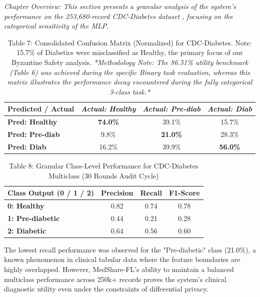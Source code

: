 \documentclass[10pt, a4paper, twocolumn]{article}
\begin{document}
\textit{Chapter Overview: This section presents a granular analysis of the system's performance on the 253,680-record CDC-Diabetes dataset \cite{cdc2015}, focusing on the categorical sensitivity of the MLP.}

\begin{table}[hbt!]
\centering
\scriptsize
\begin{tabular}{lccc}
\toprule
\textbf{Predicted / Actual} & \textit{Actual: Healthy} & \textit{Actual: Pre-diab} & \textit{Actual: Diab} \\
\midrule
\textbf{Pred: Healthy} & \textbf{74.0\%} & 39.1\% & 15.7\% \\
\textbf{Pred: Pre-diab} & 9.8\% & \textbf{21.0\%} & 28.3\% \\
\textbf{Pred: Diab} & 16.2\% & 39.9\% & \textbf{56.0\%} \\
\bottomrule
\end{tabular}
\caption{Table 7: Consolidated Confusion Matrix (Normalized) for CDC-Diabetes. Note: 15.7\% of Diabetics were misclassified as Healthy, the primary focus of our Byzantine Safety analysis. \textit{*Methodology Note: The 86.51\% utility benchmark (Table 6) was achieved during the specific Binary task evaluation, whereas this matrix illustrates the performance decay encountered during the fully categorical 3-class task.*}}
\end{table}

\begin{table}[hbt!]
\centering
\scriptsize
\begin{tabular}{lccc}
\toprule
\textbf{Class Output (0 / 1 / 2)} & \textbf{Precision} & \textbf{Recall} & \textbf{F1-Score} \\
\midrule
\textbf{0: Healthy} & 0.82 & 0.74 & 0.78 \\
\textbf{1: Pre-diabetic} & 0.44 & 0.21 & 0.28 \\
\textbf{2: Diabetic} & 0.64 & 0.56 & 0.60 \\
\bottomrule
\end{tabular}
\caption{Table 8: Granular Class-Level Performance for CDC-Diabetes Multiclass (30 Rounds Audit Cycle)}
\end{table}

The lowest recall performance was observed for the "Pre-diabetic" class (21.0\%), a known phenomenon in clinical tabular data where the feature boundaries are highly overlapped. However, MedShare-FL's ability to maintain a balanced multiclass performance across 250k+ records proves the system's clinical diagnostic utility even under the constraints of differential privacy.
\end{document}
